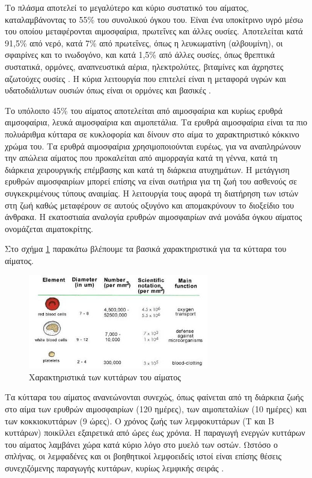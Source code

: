 	Το πλάσμα αποτελεί το μεγαλύτερο και κύριο συστατικό του αίματος, καταλαμβάνοντας το 55\% του συνολικού όγκου του. Είναι ένα υποκίτρινο υγρό μέσω του οποίου μεταφέρονται αιμοσφαίρια, πρωτεΐνες και άλλες ουσίες. Αποτελείται κατά 91,5\% από νερό, κατά 7\% από πρωτεΐνες, όπως η λευκωματίνη (αλβουμίνη), οι σφαιρίνες και το ινωδογόνο, και κατά 1,5\% από άλλες ουσίες, όπως θρεπτικά συστατικά, ορμόνες, αναπνευστικά αέρια, ηλεκτρολύτες, βιταμίνες και άχρηστες αζωτούχες ουσίες \cite{bloodPlasma}. Η κύρια λειτουργία που επιτελεί είναι η μεταφορά υγρών και υδατοδιάλυτων ουσιών όπως είναι οι ορμόνες και βασικές .

	Το υπόλοιπο 45\% του αίματος αποτελείται από αιμοσφαίρια και κυρίως ερυθρά αιμσοφαίρια, λευκά αιμοσφαίρια και αιμοπετάλια. Τα ερυθρά αιμοσφαίρια είναι τα πιο πολυάριθμα κύτταρα σε κυκλοφορία και δίνουν στο αίμα το χαρακτηριστικό κόκκινο χρώμα του. Τα ερυθρά αιμοσφαίρια χρησιμοποιούνται ευρέως, για να αναπληρώνουν την απώλεια αίματος που προκαλείται από αιμορραγία κατά τη γέννα, κατά τη διάρκεια χειρουργικής επέμβασης και κατά τη διάρκεια ατυχημάτων. Η μετάγγιση ερυθρών αιμοσφαιρίων μπορεί επίσης να είναι σωτήρια για τη ζωή του ασθενούς σε συγκεκριμένους τύπους αναιμίας. Η λειτουργία τους αφορά τη διατήρηση των ιστών στη ζωή καθώς μεταφέρουν σε αυτούς οξυγόνο και απομακρύνουν το διοξείδιο του άνθρακα. Η εκατοστιαία αναλογία ερυθρών αιμοσφαιρίων ανά μονάδα όγκου αίματος ονομάζεται αιματοκρίτης.
	
	Στο σχήμα \ref{fig:blood_cells_characteristics} παρακάτω βλέπουμε τα βασικά χαρακτηριστικά για τα κύτταρα του αίματος.
\begin{figure}[H]
	    \centering
	    \includegraphics[width=0.7\textwidth]{blood_cells_characteristics.jpg}
	    \caption{Χαρακτηριστικά των κυττάρων του αίματος}
	    \label{fig:blood_cells_characteristics}
\end{figure}

	Τα κύτταρα του αίματος ανανεώνονται συνεχώς, όπως φαίνεται από τη διάρκεια ζωής στο αίμα των ερυθρών αιμοσφαιρίων (120 ημέρες), των αιμοπεταλίων (10 ημέρες) και των κοκκιοκυττάρων (9 ώρες). Ο χρόνος ζωής των λεμφοκυττάρων (Τ και Β κυττάρων) ποικίλλει εξαιρετικά από ώρες έως χρόνια. Η παραγωγή ενεργών κυττάρων του αίματος λαμβάνει χώρα κατά κύριο λόγο στο μυελό των οστών. Ωστόσο ο σπλήνας, οι λεμφαδένες και οι βοηθητικοί λεμφοειδείς ιστοί είναι επίσης θέσεις συνεχιζόμενης παραγωγής κυττάρων, κυρίως λεμφικής σειράς \cite{textbookOfMedicine}.
	
